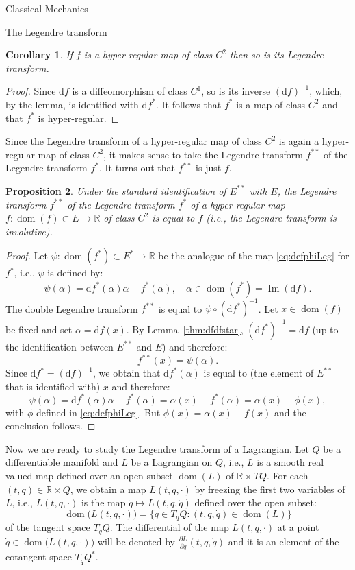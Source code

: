 \documentclass[oneside,a4paper,11pt]{amsbook}
\newcommand{\R}{\mathds R}
\newcommand{\dd}{\mathrm d}
\DeclareMathOperator{\Img}{Im}
\DeclareMathOperator{\Dom}{dom}
\theoremstyle{remark}\newtheorem{exercise}{Exercise}[chapter]
\theoremstyle{plain}\newtheorem{teo}{Theorem}[section]
\theoremstyle{plain}\newtheorem{lem}[teo]{Lemma}
\theoremstyle{plain}\newtheorem{prop}[teo]{Proposition}
\theoremstyle{plain}\newtheorem{cor}[teo]{Corollary}
\theoremstyle{definition}\newtheorem{defin}[teo]{Definition}
\theoremstyle{remark}\newtheorem{rem}[teo]{Remark}
\theoremstyle{definition}\newtheorem{notation}[teo]{Notation}
\theoremstyle{definition}\newtheorem{convention}[teo]{Convention}
\theoremstyle{definition}\newtheorem{example}[teo]{Example}
\numberwithin{section}{chapter}
\numberwithin{equation}{section}
\begin{document}
\begin{chapter}{Classical Mechanics}
\begin{section}{The Legendre transform}
\begin{cor}
If $f$ is a hyper-regular map of class $C^2$ then so is its Legendre transform.
\end{cor}
\begin{proof}
Since $\dd f$ is a diffeomorphism of class $C^1$, so is its inverse $(\dd f)^{-1}$, which, by the lemma,
is identified with $\dd f^*$. It follows that $f^*$ is a map of class $C^2$ and that $f^*$ is hyper-regular.
\end{proof}

Since the Legendre transform of a hyper-regular map of class $C^2$ is again a hyper-regular map of class $C^2$,
it makes sense to take the Legendre transform $f^{**}$ of the Legendre transform $f^*$. It turns out that $f^{**}$
is just $f$.
\begin{prop}\label{thm:Leginvolutive}
Under the standard identification of $E^{**}$ with $E$, the Legendre transform $f^{**}$ of the Legendre transform
$f^*$ of a hyper-regular map $f:\Dom(f)\subset E\to\R$ of class $C^2$ is equal to $f$ (i.e.,
the Legendre transform is {\em involutive}).
\end{prop}
\begin{proof}
Let $\psi:\Dom(f^*)\subset E^*\to\R$ be the analogue of the map \eqref{eq:defphiLeg} for $f^*$, i.e., $\psi$ is defined by:
\[\psi(\alpha)=\dd f^*(\alpha)\alpha-f^*(\alpha),\quad\alpha\in\Dom(f^*)=\Img(\dd f).\]
The double Legendre transform $f^{**}$ is equal to $\psi\circ(\dd f^*)^{-1}$. Let $x\in\Dom(f)$ be fixed and set $\alpha=\dd f(x)$.
By Lemma~\ref{thm:dfdfstar}, $(\dd f^*)^{-1}=\dd f$ (up to the identification between $E^{**}$ and $E$) and therefore:
\[f^{**}(x)=\psi(\alpha).\]
Since $\dd f^*=(\dd f)^{-1}$, we obtain that $\dd f^*(\alpha)$ is equal to (the element of $E^{**}$ that is identified with) $x$ and therefore:
\[\psi(\alpha)=\dd f^*(\alpha)\alpha-f^*(\alpha)=\alpha(x)-f^*(\alpha)=\alpha(x)-\phi(x),\]
with $\phi$ defined in \eqref{eq:defphiLeg}. But $\phi(x)=\alpha(x)-f(x)$ and the conclusion follows.
\end{proof}

Now we are ready to study the Legendre transform of a Lagrangian. Let $Q$ be a differentiable manifold and $L$ be a Lagrangian on $Q$, i.e.,
$L$ is a smooth real valued map defined over an open subset $\Dom(L)$ of $\R\times TQ$. For each $(t,q)\in\R\times Q$, we obtain a map $L(t,q,\cdot)$
by freezing the first two variables of $L$, i.e., $L(t,q,\cdot)$ is the map $\dot q\mapsto L(t,q,\dot q)$ defined over the open subset:
\[\Dom\!\big(L(t,q,\cdot)\big)=\big\{\dot q\in T_qQ:(t,q,\dot q)\in\Dom(L)\big\}\]
of the tangent space $T_qQ$. The differential of the map $L(t,q,\cdot)$ at a point $\dot q\in\Dom\!\big(L(t,q,\cdot)\big)$ will be denoted by
$\frac{\partial L}{\partial\dot q}(t,q,\dot q)$ and it is an element of the cotangent space $T_qQ^*$.


\end{section}
\end{chapter}
\end{document}
